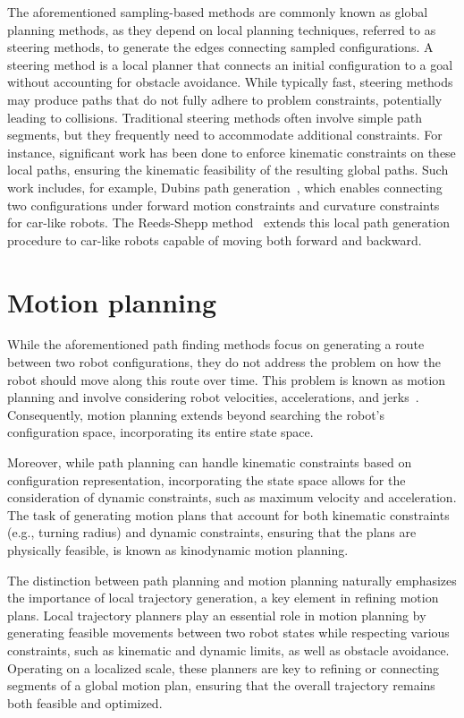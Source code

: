 The aforementioned sampling-based methods are commonly known as global planning methods, as they depend on local planning techniques, referred to as steering methods, to generate the edges connecting sampled configurations. 
A steering method is a local planner that connects an initial configuration to a goal without accounting for obstacle avoidance. 
While typically fast, steering methods may produce paths that do not fully adhere to problem constraints, potentially leading to collisions.
Traditional steering methods often involve simple path segments, but they frequently need to accommodate additional constraints.
For instance, significant work has been done to enforce kinematic constraints on these local paths, ensuring the kinematic feasibility of the resulting global paths.
Such work includes, for example, Dubins path generation~\cite{cDubins}, which enables connecting two configurations under forward motion constraints and curvature constraints for car-like robots. 
The Reeds-Shepp method~\cite{cReeds} extends this local path generation procedure to car-like robots capable of moving both forward and backward.

\section{Motion planning}\label{sec:forwardplanning}

While the aforementioned path finding methods focus on generating a route between two robot configurations, they do not address the problem on how the robot should move along this route over time.
This problem is known as motion planning and involve considering robot velocities, accelerations, and jerks~\cite{cKroger}.
Consequently, motion planning extends beyond searching the robot's configuration space, incorporating its entire state space.

Moreover, while path planning can handle kinematic constraints based on configuration representation, incorporating the state space allows for the consideration of dynamic constraints, such as maximum velocity and acceleration. 
The task of generating motion plans that account for both kinematic constraints (e.g., turning radius) and dynamic constraints, ensuring that the plans are physically feasible, is known as kinodynamic motion planning.

The distinction between path planning and motion planning naturally emphasizes the importance of local trajectory generation, a key element in refining motion plans. 
Local trajectory planners play an essential role in motion planning by generating feasible movements between two robot states while respecting various constraints, such as kinematic and dynamic limits, as well as obstacle avoidance. 
Operating on a localized scale, these planners are key to refining or connecting segments of a global motion plan, ensuring that the overall trajectory remains both feasible and optimized.

